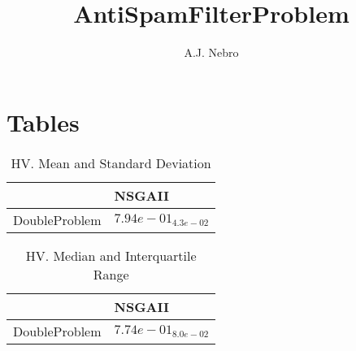 \documentclass{article}
\title{AntiSpamFilterProblem}
\author{A.J. Nebro}
\begin{document}
\maketitle
\section{Tables}

\begin{table}
\caption{HV. Mean and Standard Deviation}
\label{table: HV}
\centering
\begin{scriptsize}
\begin{tabular}{ll}
\hline &  NSGAII\\
\hline 
DoubleProblem & \cellcolor{gray95}$  7.94e-01_{ 4.3e-02}$ \\
\hline
\end{tabular}
\end{scriptsize}
\end{table}

\begin{table}
\caption{HV. Median and Interquartile Range}
\label{table: HV}
\centering
\begin{scriptsize}
\begin{tabular}{ll}
\hline &  NSGAII\\
\hline 
DoubleProblem & \cellcolor{gray95}$  7.74e-01_{ 8.0e-02}$ \\
\hline
\end{tabular}
\end{scriptsize}
\end{table}
\end{document}
